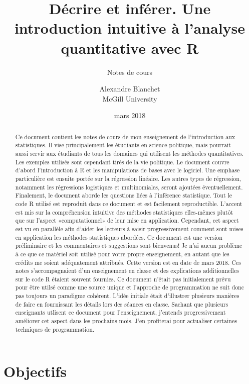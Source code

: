 \documentclass[
]{book}
\title{Décrire et inférer. Une introduction intuitive à l'analyse quantitative avec R}
\subtitle{Notes de cours}
\author{Alexandre Blanchet\\
McGill University}
\date{mars 2018}
\begin{document}
\maketitle
\begin{abstract}
Ce document contient les notes de cours de mon enseignement de l'introduction aux statistiques. Il vise principalement les étudiants en science politique, mais pourrait aussi servir aux étudiants de tous les domaines qui utilisent les méthodes quantitatives. Les exemples utilisés sont cependant tirés de la vie politique. Le document couvre d'abord l'introduction à R et les manipulations de bases avec le logiciel. Une emphase particulière est ensuite portée sur la régression linéaire. Les autres types de régression, notamment les régressions logistiques et multinomiales, seront ajoutées éventuellement. Finalement, le document aborde les questions liées à l'inférence statistique. Tout le code R utilisé est reproduit dans ce document et est facilement reproductible. L'accent est mis sur la compréhension intuitive des méthodes statistiques elles-mêmes plutôt que sur l'aspect «computationnel» de leur mise en application. Cependant, cet aspect est vu en parallèle afin d'aider les lecteurs à saisir progressivement comment sont mises en application les méthodes statistiques abordées. Ce document est une version préliminaire et les commentaires et suggestions sont bienvenus! Je n'ai aucun problème à ce que ce matériel soit utilisé pour votre propre enseignement, en autant que les crédits me soient adéquatement attribués. Cette version est en date de mars 2018. Ces notes s'accompagnaient d'un enseignement en classe et des explications additionnelles sur le code R étaient souvent fournies. Ce document n'était pas initialement prévu pour être utilsé comme une source unique et l'approche de programmation ne suit donc pas toujours un paradigme cohérent. L'idée initiale était d'illustrer plusieurs manières de faire en fournissant les détails lors des séances en classe. Sachant que plusieurs enseignants utlisent ce document pour l'enseignement, j'entends progressivement améliorer cet aspect dans les prochains mois. J'en profiterai pour actualiser certaines techniques de programmation.
\end{abstract}

{
\hypersetup{linkcolor=}
\setcounter{tocdepth}{1}
\tableofcontents
}
\hypertarget{objectifs}{%
\chapter{Objectifs}\label{objectifs}}
\end{document}
